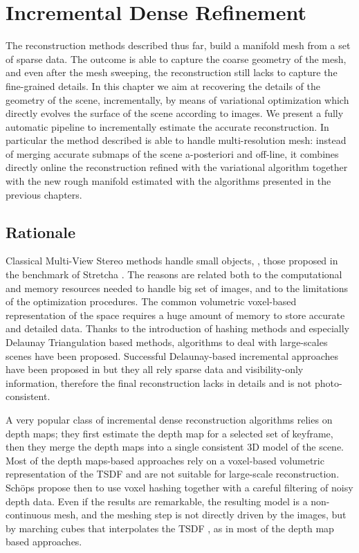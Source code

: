 \chapter{Incremental Dense Refinement}
\label{ch:incrDenseRef}
The reconstruction methods described thus far, build a manifold mesh from a set of sparse data. 
The outcome is able to capture the coarse geometry of the mesh, and even after the mesh sweeping, the reconstruction still lacks to capture the fine-grained details.
In this chapter we aim at recovering the details of the geometry of the scene, incrementally, by means of variational optimization which directly evolves the surface of the scene according to images. 
We present a fully automatic pipeline to incrementally estimate the accurate reconstruction. In particular the method described is able to handle multi-resolution mesh: instead of merging accurate submaps of the scene a-posteriori and off-line, it combines directly online the reconstruction refined with the variational algorithm together with the new rough manifold estimated with the algorithms presented in the previous chapters.

\minitoc
\newpage

\section{Rationale}

Classical Multi-View Stereo methods \cite{gargallo2005bayesian,delaunoy_et_al_08} handle small objects, \eg, those proposed in the benchmark of Stretcha \etal \cite{strecha2006combined}.
The reasons are related both to the computational and memory resources needed to handle big set of images, and to the limitations of the optimization procedures.
The common volumetric voxel-based representation of the space requires a huge amount of memory to store accurate and detailed data.
Thanks to the introduction of hashing methods and especially  Delaunay Triangulation based methods, algorithms to deal with large-scales scenes have been proposed.
Successful Delaunay-based incremental approaches have been proposed in \cite{lovi_et_al_11,hoppe2013incremental,litvinov_lhuillier_13,romanoni15b,romanoni15a} but they all rely sparse data and visibility-only information, therefore the final reconstruction lacks in details and is not photo-consistent.


A very popular class of  incremental dense reconstruction algorithms relies on depth maps; they first estimate the depth map for a selected set of keyframe, then they merge the depth maps into a single consistent 3D model of the scene. 
Most of the depth maps-based approaches \cite{pollefeys_et_al_08,collins1996space,newcombe2010live,ohtake2003multi,stuhmer2012parallel,stuckler2014multi} rely on a voxel-based volumetric representation of the TSDF and are not suitable for large-scale reconstruction. 
Sch{\"o}ps \etal \cite{schops20153d} propose then to use voxel hashing together with a careful filtering of noisy depth data.
Even if the results are remarkable, the resulting model is a non-continuous mesh, and the meshing step is not directly driven by the images, but by marching cubes \cite{lorensen1987marching} that interpolates the TSDF , as in most of the depth map based approaches.

